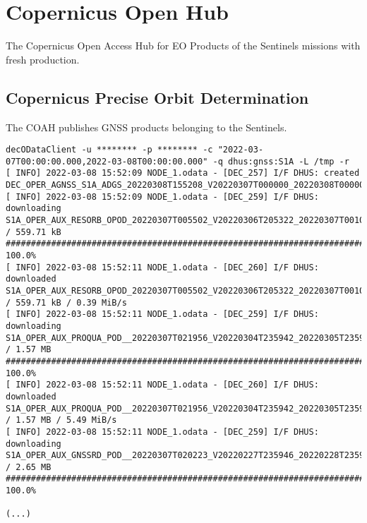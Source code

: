 \documentclass[dec_sum_main.tex]{subfiles}
\begin{document}
\pagebreak


\section{Copernicus Open Hub}

The Copernicus Open Access Hub for EO Products of the Sentinels missions with  fresh production. 

\subsection{Copernicus Precise Orbit Determination}
The COAH publishes GNSS products belonging to the Sentinels.

\begin{Verbatim}[fontsize=\tiny]
 decODataClient -u ******** -p ******** -c "2022-03-07T00:00:00.000,2022-03-08T00:00:00.000" -q dhus:gnss:S1A -L /tmp -r
[ INFO] 2022-03-08 15:52:09 NODE_1.odata - [DEC_257] I/F DHUS: created DEC_OPER_AGNSS_S1A_ADGS_20220308T155208_V20220307T000000_20220308T000000_18_00.xml
[ INFO] 2022-03-08 15:52:09 NODE_1.odata - [DEC_259] I/F DHUS: downloading S1A_OPER_AUX_RESORB_OPOD_20220307T005502_V20220306T205322_20220307T001052 / 559.71 kB
########################################################################################################################################################################################################## 100.0%
[ INFO] 2022-03-08 15:52:11 NODE_1.odata - [DEC_260] I/F DHUS: downloaded S1A_OPER_AUX_RESORB_OPOD_20220307T005502_V20220306T205322_20220307T001052 / 559.71 kB / 0.39 MiB/s
[ INFO] 2022-03-08 15:52:11 NODE_1.odata - [DEC_259] I/F DHUS: downloading S1A_OPER_AUX_PROQUA_POD__20220307T021956_V20220304T235942_20220305T235941 / 1.57 MB
########################################################################################################################################################################################################## 100.0%
[ INFO] 2022-03-08 15:52:11 NODE_1.odata - [DEC_260] I/F DHUS: downloaded S1A_OPER_AUX_PROQUA_POD__20220307T021956_V20220304T235942_20220305T235941 / 1.57 MB / 5.49 MiB/s
[ INFO] 2022-03-08 15:52:11 NODE_1.odata - [DEC_259] I/F DHUS: downloading S1A_OPER_AUX_GNSSRD_POD__20220307T020223_V20220227T235946_20220228T235936 / 2.65 MB
########################################################################################################################################################################################################## 100.0%

(...)


\end{Verbatim}
\end{document}

